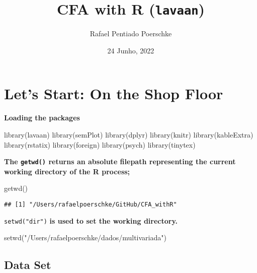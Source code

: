 \documentclass[
]{article}
\title{CFA with R (\texttt{lavaan})}
\author{Rafael Pentiado Poerschke}
\date{24 Junho, 2022}
\newenvironment{Shaded}{\begin{snugshade}}{\end{snugshade}}
\newcommand{\FunctionTok}[1]{\textcolor[rgb]{0.00,0.00,0.00}{#1}}
\newcommand{\NormalTok}[1]{#1}
\newcommand{\StringTok}[1]{\textcolor[rgb]{0.31,0.60,0.02}{#1}}
\begin{document}
\maketitle

\hypertarget{lets-start-on-the-shop-floor}{%
\section{Let's Start: On the Shop
Floor}\label{lets-start-on-the-shop-floor}}

\textbf{Loading the packages}

\begin{Shaded}
\begin{Highlighting}[]
\FunctionTok{library}\NormalTok{(lavaan)}
\FunctionTok{library}\NormalTok{(semPlot)}
\FunctionTok{library}\NormalTok{(dplyr)}
\FunctionTok{library}\NormalTok{(knitr)}
\FunctionTok{library}\NormalTok{(kableExtra)}
\FunctionTok{library}\NormalTok{(rstatix)}
\FunctionTok{library}\NormalTok{(foreign)}
\FunctionTok{library}\NormalTok{(psych)}
\FunctionTok{library}\NormalTok{(tinytex)}
\end{Highlighting}
\end{Shaded}

\textbf{The \texttt{getwd()} returns an absolute filepath representing
the current working directory of the R process;}

\begin{Shaded}
\begin{Highlighting}[]
\FunctionTok{getwd}\NormalTok{()}
\end{Highlighting}
\end{Shaded}

\begin{verbatim}
## [1] "/Users/rafaelpoerschke/GitHub/CFA_withR"
\end{verbatim}

\texttt{setwd("dir")} \textbf{is used to set the working directory.}

\begin{Shaded}
\begin{Highlighting}[]
\FunctionTok{setwd}\NormalTok{(}\StringTok{"/Users/rafaelpoerschke/dados/multivariada"}\NormalTok{)}
\end{Highlighting}
\end{Shaded}

\hypertarget{data-set}{%
\subsection{Data Set}\label{data-set}}
\end{document}
